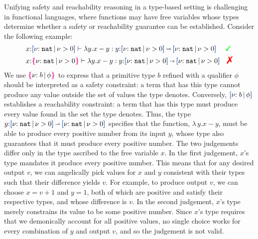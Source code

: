 Unifying safety and reachability reasoning in a type-based setting
is challenging in functional languages, where functions may have
free variables whose types determine whether a safety or reachability
guarantee can be established.  Consider the following example:
\vspace{-0.2em}
\begin{align*}
    &x{:}\urt{\Nat}{\vnu > 0} \vdash \lambda y.x - y : y{:}\urt{\Nat}{\vnu > 0} \sarr \urt{\Nat}{\vnu > 0} \quad\ \textcolor{green}{\text{\ding{51}}}
    \\&x{:}\ort{\Nat}{\vnu > 0} \vdash \lambda y.x - y : y{:}\urt{\Nat}{\vnu > 0} \sarr \urt{\Nat}{\vnu > 0} \quad\judgfail
\end{align*}\noindent
We use $\textcolor{magenta}{\mbox{\rm\textbf{\{}}} { {\nu}{:}\;{b}\, |\, {\phi} } \textcolor{magenta}{\mbox{\rm\textbf{\}}}}$ to express that a primitive type $b$ refined
with a qualifier $\phi$ should be interpreted as a safety constraint:
a term that has this type cannot produce any value outside the set of
values the type denotes.  Conversely, $\urt{b}{\phi}$ establishes a
reachability constraint: a term that has this type must produce every
value found in the set the type denotes.  Thus, the type
$y{:}\urt{\Nat}{\vnu > 0} \sarr \urt{\Nat}{\vnu > 0}$ specifies that
the function, $\lambda\, y. x - y$, must be able to produce every
positive number from its input $y$, whose type also guarantees that it
must produce every positive number.  The two judgements differ only in
the type ascribed to the free variable $x$.  In the first judgement,
$x$'s type mandates it produce every positive number.  This means that
for any desired output $v$, we can angelically pick values for $x$ and
$y$ consistent with their types such that their difference yields $v$.
For example, to produce output $v$, we can choose $x = v + 1$ and $y =
1$, both of which are positive and satisfy their respective types, and
whose difference is $v$.  In the second judgement, $x$'s type merely
constrains its value to be some positive number.  Since $x$'s type
requires that we demonically account for all positive values, no
single choice works for every combination of $y$ and output $v$, and
so the judgement is not valid.

\fi

